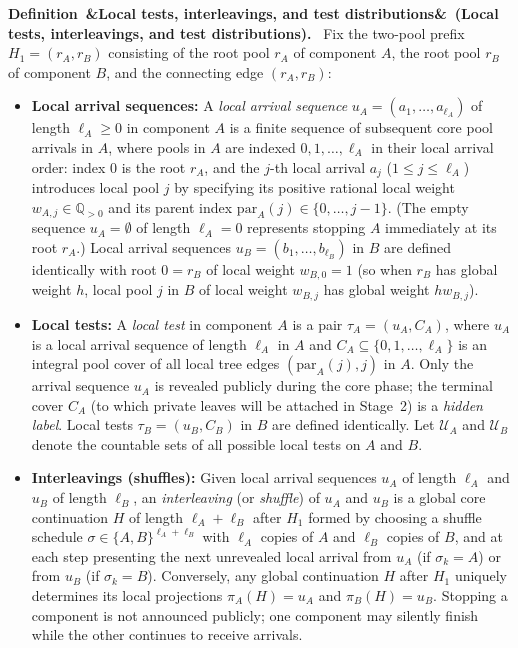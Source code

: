\documentclass[11pt,letterpaper]{article}
\newenvironment{definition}[1][]{\refstepcounter{lemma}\par\medskip\noindent\textbf{Definition~\thelemma\ifx&#1&\else\ (#1)\fi.}\ \ignorespaces}{\par\medskip}
\begin{document}
\begin{definition}[Local tests, interleavings, and test distributions]\label{def:interleaving}
Fix the two-pool prefix $H_1=(r_A,r_B)$ consisting of the root pool $r_A$ of component $A$, the root pool $r_B$ of component $B$, and the connecting edge $(r_A,r_B)$:
\begin{itemize}
\item \textbf{Local arrival sequences:} A \emph{local arrival sequence} $u_A=(a_1,\ldots,a_{\ell_A})$ of length $\ell_A\ge 0$ in component $A$ is a finite sequence of subsequent core pool arrivals in $A$, where pools in $A$ are indexed $0,1,\ldots,\ell_A$ in their local arrival order: index $0$ is the root $r_A$, and the $j$-th local arrival $a_j$ ($1\le j\le\ell_A$) introduces local pool $j$ by specifying its positive rational local weight $w_{A,j}\in\mathbb Q_{>0}$ and its parent index $\mathrm{par}_A(j)\in\{0,\ldots,j-1\}$. (The empty sequence $u_A=\emptyset$ of length $\ell_A=0$ represents stopping $A$ immediately at its root $r_A$.) Local arrival sequences $u_B=(b_1,\ldots,b_{\ell_B})$ in $B$ are defined identically with root $0=r_B$ of local weight $w_{B,0}=1$ (so when $r_B$ has global weight $h$, local pool $j$ in $B$ of local weight $w_{B,j}$ has global weight $h w_{B,j}$).
\item \textbf{Local tests:} A \emph{local test} in component $A$ is a pair $\tau_A=(u_A,C_A)$, where $u_A$ is a local arrival sequence of length $\ell_A$ in $A$ and $C_A\subseteq\{0,1,\ldots,\ell_A\}$ is an integral pool cover of all local tree edges $(\mathrm{par}_A(j),j)$ in $A$. Only the arrival sequence $u_A$ is revealed publicly during the core phase; the terminal cover $C_A$ (to which private leaves will be attached in Stage~2) is a \emph{hidden label}. Local tests $\tau_B=(u_B,C_B)$ in $B$ are defined identically. Let $\mathcal U_A$ and $\mathcal U_B$ denote the countable sets of all possible local tests on $A$ and $B$.
\item \textbf{Interleavings (shuffles):} Given local arrival sequences $u_A$ of length $\ell_A$ and $u_B$ of length $\ell_B$, an \emph{interleaving} (or \emph{shuffle}) of $u_A$ and $u_B$ is a global core continuation $H$ of length $\ell_A+\ell_B$ after $H_1$ formed by choosing a shuffle schedule $\sigma\in\{A,B\}^{\ell_A+\ell_B}$ with $\ell_A$ copies of $A$ and $\ell_B$ copies of $B$, and at each step presenting the next unrevealed local arrival from $u_A$ (if $\sigma_k=A$) or from $u_B$ (if $\sigma_k=B$). Conversely, any global continuation $H$ after $H_1$ uniquely determines its local projections $\pi_A(H)=u_A$ and $\pi_B(H)=u_B$. Stopping a component is not announced publicly; one component may silently finish while the other continues to receive arrivals.

\end{itemize}
\end{definition}
\end{document}
